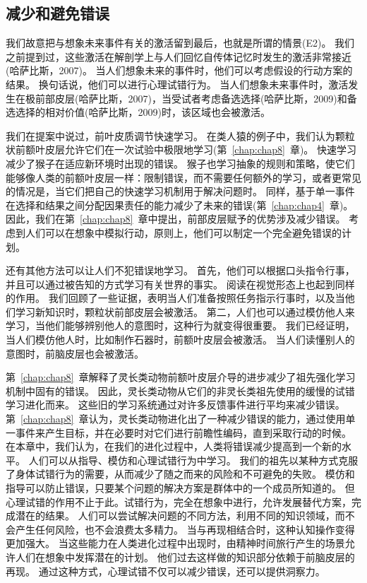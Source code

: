 \subsection{减少和避免错误}

我们故意把与想象未来事件有关的激活留到最后，也就是所谓的情景(E2)。
我们之前提到过，这些激活在解剖学上与人们回忆自传体记忆时发生的激活非常接近(哈萨比斯，2007)。
当人们想象未来的事件时，他们可以考虑假设的行动方案的结果。
换句话说，他们可以进行心理试错行为。
当人们想象未来事件时，激活发生在极前部皮层(哈萨比斯，2007)，当受试者考虑备选选择(哈萨比斯，2009)和备选选择的相对价值(哈萨比斯，2009)时，该区域也会被激活。


我们在提案中说过，前叶皮质调节快速学习。
在类人猿的例子中，我们认为颗粒状前额叶皮层允许它们在一次试验中极限地学习(第~\ref{chap:chap8}~章)。
快速学习减少了猴子在适应新环境时出现的错误。
猴子也学习抽象的规则和策略，使它们能够像人类的前额叶皮层一样：限制错误，而不需要任何额外的学习，或者更常见的情况是，当它们把自己的快速学习机制用于解决问题时。
同样，基于单一事件在选择和结果之间分配因果责任的能力减少了未来的错误(第~\ref{chap:chap4}~章)。
因此，我们在第~\ref{chap:chap8}~章中提出，前部皮层赋予的优势涉及减少错误。
考虑到人们可以在想象中模拟行动，原则上，他们可以制定一个完全避免错误的计划。


还有其他方法可以让人们不犯错误地学习。
首先，他们可以根据口头指令行事，并且可以通过被告知的方式学习有关世界的事实。
阅读在视觉形态上也起到同样的作用。
我们回顾了一些证据，表明当人们准备按照任务指示行事时，以及当他们学习新知识时，颗粒状前部皮层会被激活。
第二，人们也可以通过模仿他人来学习，当他们能够辨别他人的意图时，这种行为就变得很重要。
我们已经证明，当人们模仿他人时，比如制作石器时，前额叶皮层会被激活。
当人们读懂别人的意图时，前脑皮层也会被激活。


第~\ref{chap:chap8}~章解释了灵长类动物前额叶皮层介导的进步减少了祖先强化学习机制中固有的错误。
因此，灵长类动物从它们的非灵长类祖先使用的缓慢的试错学习进化而来。
这些旧的学习系统通过对许多反馈事件进行平均来减少错误。
第~\ref{chap:chap8}~章认为，灵长类动物进化出了一种减少错误的能力，通过使用单一事件来产生目标，并在必要时对它们进行前瞻性编码，直到采取行动的时候。
在本章中，我们认为，在我们的进化过程中，人类将错误减少提高到一个新的水平。
人们可以从指导、模仿和心理试错行为中学习。
我们的祖先以某种方式克服了身体试错行为的需要，从而减少了随之而来的风险和不可避免的失败。
模仿和指导可以防止错误，只要某个问题的解决方案是群体中的一个成员所知道的。
但心理试错的作用不止于此。试错行为，完全在想象中进行，允许发展替代方案，完成潜在的结果。
人们可以尝试解决问题的不同方法，利用不同的知识领域，而不会产生任何风险，也不会浪费太多精力。
当与再现相结合时，这种认知操作变得更加强大。
当这些能力在人类进化过程中出现时，由精神时间旅行产生的场景允许人们在想象中发挥潜在的计划。
他们过去这样做的知识部分依赖于前脑皮层的再现。
通过这种方式，心理试错不仅可以减少错误，还可以提供洞察力。

